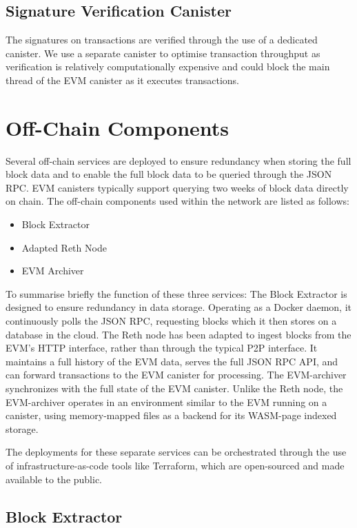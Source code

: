 \documentclass{article}
\begin{document}
\subsection{Signature Verification Canister}

The signatures on transactions are verified through the use of a dedicated canister. We use a separate canister  to optimise transaction throughput as verification is relatively computationally expensive and could block the main thread of the EVM canister as it executes transactions.

\section{Off-Chain Components}


Several off-chain services are deployed to ensure redundancy when storing the full block data and to enable the full block data to be queried through the JSON RPC. EVM canisters typically support querying two weeks of block data directly on chain. The off-chain components used within the network are listed as follows:

\begin{itemize}
    \item Block Extractor
    \item Adapted Reth Node
    \item EVM Archiver
\end{itemize}


 To summarise briefly the function of these three services: The Block Extractor is designed to ensure redundancy in data storage. Operating as a Docker daemon, it continuously polls the JSON RPC, requesting blocks which it then stores on a database in the cloud. The  Reth node has been adapted  to ingest blocks from the EVM’s HTTP interface, rather than through the typical P2P interface. It maintains a full history of the EVM data, serves the full JSON RPC API, and can forward transactions to the EVM canister for processing. The EVM-archiver synchronizes with the full state of the EVM canister. Unlike the Reth node, the EVM-archiver operates in an environment similar to the EVM running on a canister, using memory-mapped files as a backend for its WASM-page indexed storage.

The deployments for these separate services can be orchestrated through the use of infrastructure-as-code tools like Terraform, which are open-sourced and made available to the public.

\subsection{Block Extractor}
\end{document}
